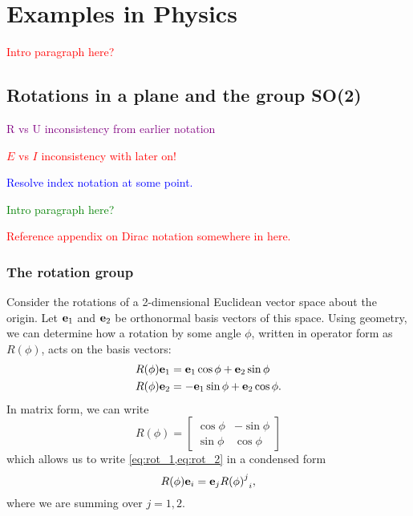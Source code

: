 \chapter{Examples in Physics}\label{ch:Phys_applications}

\textcolor{red}{Intro paragraph here?}

\section{Rotations in a plane and the group SO(2)}\label{sec:SO2}
\textcolor{purple}{R vs U inconsistency from earlier notation}

\textcolor{red}{$E$ vs $I$ inconsistency with later on!}

\textcolor{blue}{Resolve index notation at some point.}

\textcolor{green}{Intro paragraph here?}

\textcolor{red}{Reference appendix on Dirac notation somewhere in here.}

\subsection{The rotation group}
Consider the rotations of a 2-dimensional Euclidean vector space about the origin. Let $\mathbf{e}_1$ and $\mathbf{e}_2$ be orthonormal basis vectors of this space. Using geometry, we can determine how a rotation by some angle $\phi$, written in operator form as $R(\phi)$, acts on the basis vectors:
    \begin{align}
        R(\phi)\mathbf{e}_1 &= \mathbf{e}_1\cos\phi + \mathbf{e}_2\sin\phi \label{eq:rot_1}\\
        R(\phi)\mathbf{e}_2 &= -\mathbf{e}_1\sin\phi + \mathbf{e}_2\cos\phi.\label{eq:rot_2}
    \end{align}
    In matrix form, we can write
    \begin{equation}
        R(\phi) = 
        \begin{bmatrix}
            \cos\phi & -\sin\phi \\
            \sin\phi & \cos\phi
        \end{bmatrix}
    \end{equation}
    which allows us to write \cref{eq:rot_1,eq:rot_2} in a condensed form
    \begin{equation}
        R(\phi)\mathbf{e}_i = \mathbf{e}_j{{R(\phi)}^j}_i,
    \end{equation}
    where we are summing over $j=1,2$.

